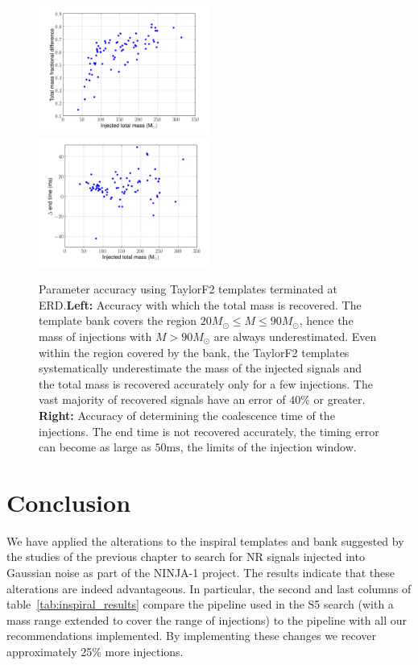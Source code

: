\begin{figure}
    \includegraphics[width=0.50\textwidth]{figures/ninja1/spa_erd_3_5pn_mass_estimate}
    \includegraphics[width=0.50\textwidth]{figures/ninja1/spa_erd_3_5pn_time_estimate_vs_mt}
\caption[Parameter accuracy using TaylorF2 templates terminated at ERD]{
\label{fig:3_5pn_params}
Parameter accuracy using TaylorF2 templates terminated at
ERD.\textbf{Left:} Accuracy with which the total mass is recovered. The
template bank covers the region $20 M_\odot \le M \le 90 M_\odot$, hence
the mass of injections with $M > 90 M_\odot$ are always underestimated.
Even within the region covered by the bank, the TaylorF2 templates
systematically underestimate the mass of the injected signals and the total
mass is recovered accurately only for a few injections.  The vast majority of
recovered signals have an error of $40\%$ or greater. \textbf{Right:} Accuracy
of determining the coalescence time of the injections.  The end time is not
recovered accurately, the timing error can become as large as $50
\mathrm{ms}$, the limits of the injection window.}
\end{figure}



\section{Conclusion}
%

We have applied the alterations to the inspiral templates and bank
suggested by the studies of the previous chapter to search for NR
signals injected into Gaussian noise as part of the NINJA-1 project.
The results indicate that these alterations are indeed advantageous.
In particular, the second and last columns of
table~\ref{tab:inspiral_results} compare the pipeline used in the S5
search (with a mass range extended to cover the range of injections)
to the pipeline with all our recommendations implemented.  By
implementing these changes we recover approximately 25\% more
injections.

